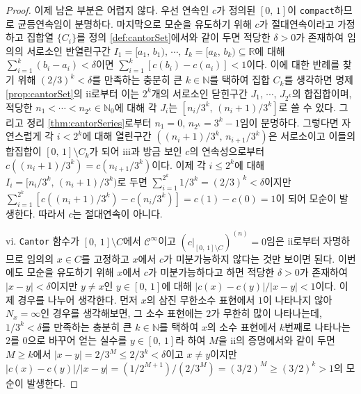 \begin{proof}
    이제 남은 부분은 어렵지 않다. 우선 연속인 $c$가 정의된 $[0,\,1]$이 \texttt{compact}하므로 균등연속임이 분명하다. 마지막으로 모순을 유도하기 위해 $c$가 절대연속이라고 가정하고 집합열 $\{C_i\}$를 정의 \ref{def:cantorSet}에서와 같이 두면 적당한 $\delta>0$가 존재하여 임의의 서로소인 반열린구간 $I_1=[a_1,\,b_1),\,\cdots,\,I_k=[a_k,\,b_k)\subseteq\mathbb{R}$에 대해 $\sum_{i=1}^k(b_i-a_i)<\delta$이면 $\sum_{i=1}^k[c(b_i)-c(a_i)]<1$이다. 이에 대한 반례를 찾기 위해 $(2/3)^k<\delta$를 만족하는 충분히 큰 $k\in\mathbb{N}$를 택하여 집합 $C_k$를 생각하면 명제 \ref{prop:cantorSet}의 ii로부터 이는 $2^k$개의 서로소인 닫힌구간 $J_1,\,\cdots,\,J_{2^k}$의 합집합이며, 적당한 $n_1<\cdots<n_{2^k}\in\mathbb{N}_0$에 대해 각 $J_i$는 $[n_i/3^k,\,(n_i+1)/3^k]$로 쓸 수 있다. 그리고 정리 \ref{thm:cantorSeries}로부터 $n_1=0,\,n_{2^k}=3^k-1$임이 분명하다. 그렇다면 자연스럽게 각 $i<2^k$에 대해 열린구간 $((n_i+1)/3^k,\,n_{i+1}/3^k)$은 서로소이고 이들의 합집합이 $[0,\,1]\setminus C_k$가 되어 iii과 방금 보인 $c$의 연속성으로부터 $c((n_i+1)/3^k)=c(n_{i+1}/3^k)$이다. 이제 각 $i\leq2^k$에 대해 $I_i=[n_i/3^k,\,(n_i+1)/3^k)$로 두면 $\sum_{i=1}^{2^k}1/3^k=(2/3)^k<\delta$이지만 $\sum_{i=1}^{2^k}[c((n_i+1)/3^k)-c(n_i/3^k)]=c(1)-c(0)=1$이 되어 모순이 발생한다. 따라서 $c$는 절대연속이 아니다.

    vi. \texttt{Cantor} 함수가 $[0,\,1]\setminus C$에서 $\mathcal{C}^\infty$이고 $(c\vert_{[0,\,1]\setminus C})^{(n)}=0$임은 ii로부터 자명하므로 임의의 $x\in C$를 고정하고 $x$에서 $c$가 미분가능하지 않다는 것만 보이면 된다. 이번에도 모순을 유도하기 위해 $x$에서 $c$가 미분가능하다고 하면 적당한 $\delta>0$가 존재하여 $|x-y|<\delta$이지만 $y\ne x$인 $y\in[0,\,1]$에 대해 $|c(x)-c(y)|/|x-y|<1$이다. 이제 경우를 나누어 생각한다. 먼저 $x$의 삼진 무한소수 표현에서 $1$이 나타나지 않아 $N_x=\infty$인 경우를 생각해보면, 그 소수 표현에는 $2$가 무한히 많이 나타나는데, $1/3^k<\delta$를 만족하는 충분히 큰 $k\in\mathbb{N}$를 택하여 $x$의 소수 표현에서 $k$번째로 나타나는 $2$를 $0$으로 바꾸어 얻는 실수를 $y\in[0,\,1]$라 하여 $M$을 ii의 증명에서와 같이 두면 $M\geq k$에서 $|x-y|=2/3^M\leq2/3^k<\delta$이고 $x\ne y$이지만 $|c(x)-c(y)|/|x-y|=(1/2^{M+1})/(2/3^M)=(3/2)^M\geq(3/2)^k>1$의 모순이 발생한다.


\end{proof}
